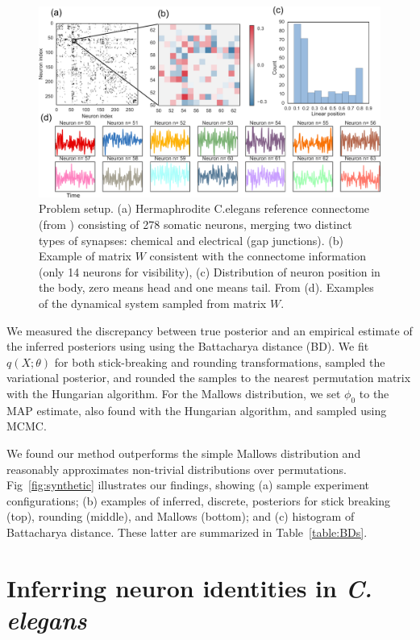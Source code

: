 \documentclass[twoside]{article}
\begin{document}
\begin{figure}[ht]
  \centering
  \includegraphics[width=6in]{../figures/figure6.pdf} 
  \caption{Problem setup. (a) Hermaphrodite C.elegans reference
    connectome (from \cite{varshney2011structural,wormatlas})
    consisting of 278 somatic neurons, merging two distinct types of
    synapses: chemical and electrical (gap junctions). (b) Example of
    matrix $W$ consistent with the connectome information (only 14
    neurons for visibility), (c) Distribution of neuron position in
    the body, zero means head and one means tail. From
    \cite{white1986structure,wormatlas} (d). Examples of the dynamical
    system sampled from matrix $W$.}
  \label{fig:connectome}
\end{figure}

We measured the discrepancy between true posterior and an empirical
estimate of the inferred posteriors using using the Battacharya
distance (BD). We fit $q(X; \theta)$ for both stick-breaking and
rounding transformations, sampled the variational posterior, and
rounded the samples to the nearest permutation matrix with the
Hungarian algorithm. For the Mallows distribution, we set $\phi_0$ to
the MAP estimate, also found with the Hungarian algorithm, and sampled
using MCMC.
 
We found our method outperforms the simple Mallows distribution and
reasonably approximates non-trivial distributions over
permutations. Fig~\ref{fig:synthetic} illustrates our findings,
showing (a) sample experiment configurations; (b) examples of
inferred, discrete, posteriors for stick breaking (top), rounding
(middle), and Mallows (bottom); and (c) histogram of Battacharya distance.
These latter are summarized in Table~\ref{table:BDs}.


\section{Inferring neuron identities in \textit{C. elegans}}
\label{sec:celegans}
\end{document}
